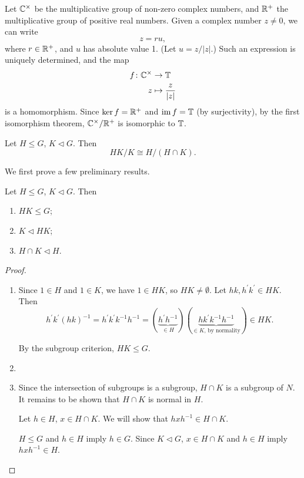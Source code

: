 \begin{example}
Let $\mathbb C^\times$ be the multiplicative group of non-zero complex numbers, and $\mathbb R^+$ the multiplicative group of positive real numbers.
Given a complex number $z\neq0$, we can write
\[z=ru,\]
where $r\in\mathbb R^+$, and $u$ has absolute value 1. (Let $u=z/|z|$.) Such an expression is uniquely determined, and the map
\begin{align*}
f\colon\mathbb C^\times&\to\mathbb T\\
z&\mapsto\frac{z}{|z|}
\end{align*}
is a homomorphism. Since $\ker f=\mathbb R^+$ and $\operatorname{im} f=\mathbb T$ (by surjectivity), by the first isomorphism theorem, $\mathbb C^\times/\mathbb R^+$ is isomorphic to $\mathbb T$.
\end{example}

\begin{theorem}
Let $H\le G$, $K\triangleleft G$. Then
\begin{equation}
HK/K\cong H/(H\cap K).
\end{equation}
\end{theorem}

We first prove a few preliminary results.

\begin{lemma*}
Let $H\le G$, $K\triangleleft G$. Then
\begin{enumerate}[label=(\roman*)]
\item $HK\le G$;
\item $K\triangleleft HK$;
\item $H\cap K\triangleleft H$.
\end{enumerate}
\end{lemma*}

\begin{proof} \
\begin{enumerate}[label=(\roman*)]
\item Since $1\in H$ and $1\in K$, we have $1\in HK$, so $HK\neq\emptyset$.
Let $hk,h^\prime k^\prime\in HK$. Then
\[h^\prime k^\prime(hk)^{-1}
=h^\prime k^\prime k^{-1}h^{-1}
=(\underbrace{h^\prime h^{-1}}_{\in H})(\underbrace{hk^\prime k^{-1}h^{-1}}_{\in K\text{, by normality}})\in HK.\]

By the subgroup criterion, $HK\le G$.

\item 

\item Since the intersection of subgroups is a subgroup, $H\cap K$ is a subgroup of $N$.
It remains to be shown that $H\cap K$ is normal in $H$.

Let $h\in H$, $x\in H\cap K$. We will show that $hxh^{-1}\in H\cap K$. 

$H\le G$ and $h\in H$ imply $h\in G$. Since $K\triangleleft G$, $x\in H\cap K$ and $h\in H$ imply $hxh^{-1}\in H$.
\end{enumerate}
\end{proof}

